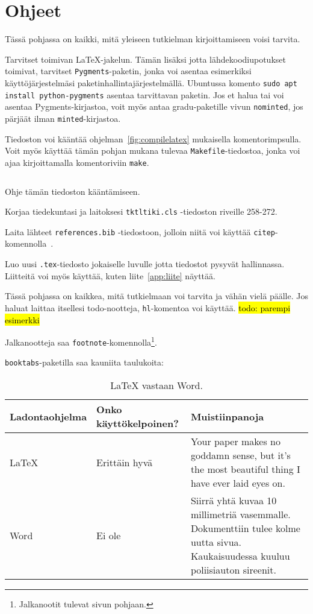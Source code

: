 \section{Ohjeet}

Tässä pohjassa on kaikki, mitä yleiseen tutkielman kirjoittamiseen voisi
tarvita.

Tarvitset toimivan LaTeX-jakelun. Tämän lisäksi jotta lähdekoodiupotukset
toimivat, tarvitset \texttt{Pygments}-paketin, jonka voi asentaa esimerkiksi
käyttöjärjestelmäsi paketinhallintajärjestelmällä. Ubuntussa komento
\texttt{sudo apt install python-pygments} asentaa tarvittavan paketin. Jos et
halua tai voi asentaa Pygments-kirjastoa, voit myös antaa gradu-paketille vivun
\texttt{nominted}, jos pärjäät ilman \texttt{minted}-kirjastoa.

Tiedoston voi kääntää ohjelman~\ref{fig:compilelatex} mukaisella
komentorimpsulla. Voit myös käyttää tämän pohjan mukana tulevaa
\texttt{Makefile}-tiedostoa, jonka voi ajaa kirjoittamalla komentoriviin
\texttt{make}.

\begin{listing}[ht!]
    \inputminted{Shell}{compile.sh}
    \caption{Ohje tämän tiedoston kääntämiseen.}
    \label{fig:compilelatex}
\end{listing}

Korjaa tiedekuntasi ja laitoksesi \texttt{tktltiki.cls} -tiedoston riveille 258-272.

Laita lähteet \texttt{references.bib} -tiedostoon, jolloin niitä voi
käyttää \texttt{citep}-komennolla~\citep{latexpohja}.

Luo uusi \texttt{.tex}-tiedosto jokaiselle luvulle jotta tiedostot pysyvät
hallinnassa. Liitteitä voi myös käyttää, kuten liite~\ref{app:liite} näyttää.

Tässä pohjassa on kaikkea, mitä tutkielmaan voi tarvita ja vähän vielä päälle.
Jos haluat laittaa itsellesi todo-nootteja, \texttt{hl}-komentoa voi käyttää.
\hl{todo: parempi esimerkki}

Jalkanootteja saa \texttt{footnote}-komennolla\footnote{Jalkanootit tulevat
sivun pohjaan.}.

\newpage

\texttt{booktabs}-paketilla saa kauniita taulukoita:

\begin{table}[ht!]
    \begin{tabular}{@{}llp{8.5cm}@{}} \toprule
    Ladontaohjelma & Onko käyttökelpoinen? & Muistiinpanoja \\ \midrule
    \LaTeX         & Erittäin hyvä         & Your paper makes no goddamn sense, but it's the most beautiful thing I have ever laid eyes on. \\
    Word           & Ei ole                & Siirrä yhtä kuvaa 10 millimetriä vasemmalle. Dokumenttiin tulee kolme uutta sivua. Kaukaisuudessa kuuluu poliisiauton sireenit. \\ \bottomrule
    \end{tabular}

    \caption{LaTeX vastaan Word.}
    \label{table:properties}
\end{table}
